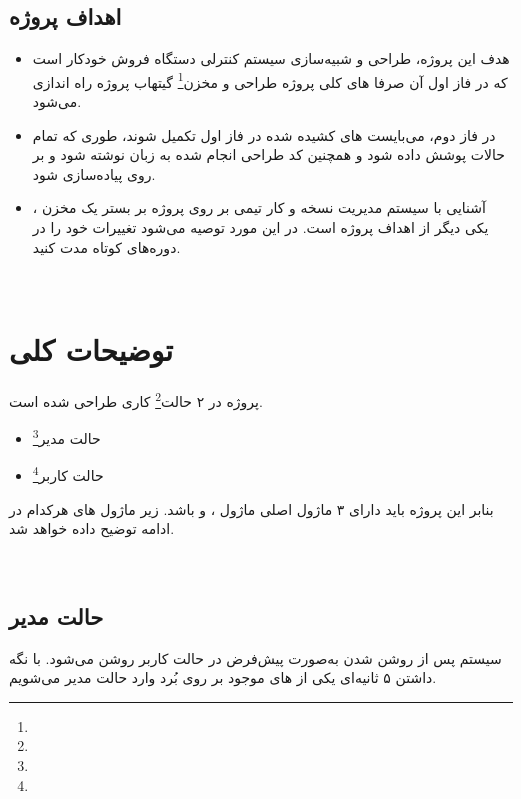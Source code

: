 \documentclass[]{article}
\begin{document}
\subsection*{{\titr اهداف پروژه}}
\begin{itemize}
	\item
	هدف این پروژه، طراحی و شبیه‌سازی سیستم کنترلی دستگاه فروش خودکار است که در فاز اول آن صرفا  های کلی پروژه طراحی و مخزن\footnote{} گیتهاب پروژه راه اندازی می‌شود. 
	
	\item 
	در فاز دوم، می‌بایست  های کشیده شده در فاز اول تکمیل شوند، طوری که تمام حالات پوشش داده شود و همچنین کد طراحی انجام شده به زبان  نوشته شود و بر روی  پیاده‌سازی شود.
	\item 
	آشنایی با سیستم مدیریت نسخه  و کار تیمی بر روی پروژه بر بستر یک مخزن ، یکی دیگر از اهداف پروژه است. در این مورد توصیه می‌شود تغییرات خود را در دوره‌های کوتاه مدت  کنید.
\end{itemize}



 \Large \textbf{\\
}


\section*{{\titr توضیحات کلی }}
\label{sec:detail}

پروژه در ۲ حالت\footnote{} کاری طراحی شده است.
\begin{itemize}
	\item حالت مدیر\footnote{}
	\item حالت کاربر\footnote{}
\end{itemize}

بنابر این پروژه باید دارای ۳ ماژول اصلی ماژول ،  و   باشد. زیر ماژول های هرکدام در ادامه توضیح داده خواهد شد.





\newpage
\Large \textbf{\\
}

\subsection*{{\titr حالت مدیر}} 
سیستم پس از روشن شدن به‌صورت پیش‌فرض در حالت کاربر روشن می‌شود. با نگه داشتن ۵ ثانیه‌ای یکی از  های موجود بر روی بُرد وارد حالت مدیر می‌شویم.
\end{document}
